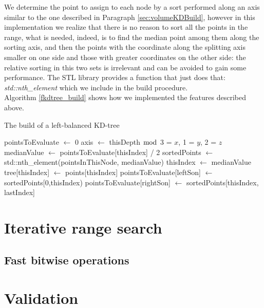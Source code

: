 We determine the point to assign to each node by a sort performed along an axis similar to the one described in Paragraph \ref{sec:volumeKDBuild}, however in this implementation we realize that there is no reason to sort all the points in the range, what is needed, indeed, is to find the median point among them along the sorting axis, and then the points with the coordinate along the splitting axis smaller on one side and those with greater coordinates on the other side: the relative sorting in this two sets is irrelevant and can be avoided to gain some performance. The STL library provides a function that just does that: \textit{std::nth\_element} which we include in the build procedure.\\
Algorithm \ref{fkdtree_build} shows how we implemented the features described above.\\

\begin{algorithm}
\caption{The build of a left-balanced KD-tree}
\label{fkdtree_build}
\begin{algorithmic}
  \State pointsToEvaluate $\gets$ 0
  \State axis $\gets$ thisDepth $\bmod$ 3  = $x$, 1 = $y$, 2 = $z$
	  	\State medianValue $\gets$ pointsToEvaluate[thisIndex] / 2
	  	\State sortedPoints $\gets$ std::nth\_element(pointsInThisNode, medianValue)
	  	\State thisIndex $\gets$ medianValue
	  	\State tree[thisIndex] $\gets$ points[thisIndex]
	  	\State pointsToEvaluate[leftSon] $\gets$ sortedPoints[0,thisIndex)
	  	\State pointsToEvaluate[rightSon] $\gets$ sortedPoints[thisIndex, lastIndex]
	  \EndFor
  \EndFor
\EndProcedure
\end{algorithmic}
\end{algorithm}

\section{Iterative range search}

\subsection{Fast bitwise operations}

\section{Validation}

